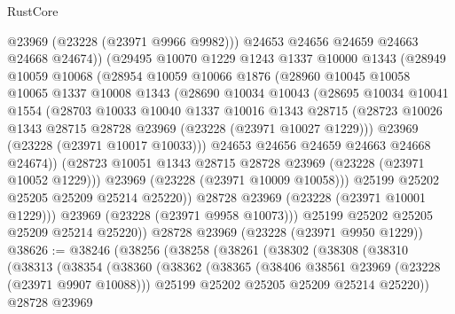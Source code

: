 \begin{lexlean}{RustCore}
\begin{coremodule}
                @23969
                (@23228 (@23971 @9966 @9982)))
              @24653
              @24656
              @24659
              @24663
              @24668
              @24674))
          (@29495
            @10070
            @1229
            @1243
            @1337
            @10000
            @1343
            (@28949
              @10059
              @10068
              (@28954
                @10059
                @10066
                @1876
                (@28960
                  @10045
                  @10058
                  @10065
                  @1337
                  @10008
                  @1343
                  (@28690
                    @10034
                    @10043
                    (@28695
                      @10034
                      @10041
                      @1554
                      (@28703
                        @10033
                        @10040
                        @1337
                        @10016
                        @1343
                        @28715
                        (@28723 @10026 @1343 @28715 @28728 @23969 (@23228 (@23971 @10027 @1229)))
                        @23969
                        (@23228 (@23971 @10017 @10033)))
                      @24653
                      @24656
                      @24659
                      @24663
                      @24668
                      @24674))
                  (@28723 @10051 @1343 @28715 @28728 @23969 (@23228 (@23971 @10052 @1229)))
                  @23969
                  (@23228 (@23971 @10009 @10058)))
                @25199
                @25202
                @25205
                @25209
                @25214
                @25220))
            @28728
            @23969
            (@23228 (@23971 @10001 @1229)))
          @23969
          (@23228 (@23971 @9958 @10073)))
        @25199
        @25202
        @25205
        @25209
        @25214
        @25220))
    @28728
    @23969
    (@23228 (@23971 @9950 @1229))
@38626 := @38246
    (@38256
      (@38258
        (@38261
          (@38302
            (@38308
              (@38310
                (@38313
                  (@38354
                    (@38360
                      (@38362
                        (@38365
                          (@38406 @38561 @23969 (@23228 (@23971 @9907 @10088)))
                          @25199
                          @25202
                          @25205
                          @25209
                          @25214
                          @25220))
                      @28728
                      @23969

\end{coremodule}
\end{lexlean}
